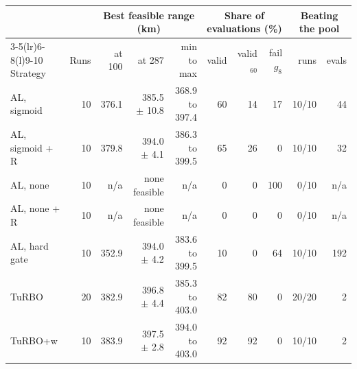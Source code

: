 \begin{tabular*}{\linewidth}{@{\extracolsep{\fill}}lrrrrrrrrr@{}}
\toprule
 & & \multicolumn{3}{c}{Best feasible range (km)} & \multicolumn{3}{c}{Share of evaluations (\%)} & \multicolumn{2}{c}{Beating the pool} \\
\cmidrule(lr){3-5}\cmidrule(lr){6-8}\cmidrule(l){9-10}
Strategy & Runs & at 100 & at 287 & min to max & valid & valid$_{60}$ & fail $g_8$ & runs & evals \\
\midrule
AL, sigmoid & 10 & 376.1 & 385.5 $\pm$ 10.8 & 368.9 to 397.4 & 60 & 14 & 17 & 10/10 & 44 \\
AL, sigmoid + R & 10 & 379.8 & 394.0 $\pm$ 4.1 & 386.3 to 399.5 & 65 & 26 & 0 & 10/10 & 32 \\
AL, none & 10 & n/a & none feasible & n/a & 0 & 0 & 100 & 0/10 & n/a \\
AL, none + R & 10 & n/a & none feasible & n/a & 0 & 0 & 0 & 0/10 & n/a \\
AL, hard gate & 10 & 352.9 & 394.0 $\pm$ 4.2 & 383.6 to 399.5 & 10 & 0 & 64 & 10/10 & 192 \\
TuRBO & 20 & 382.9 & 396.8 $\pm$ 4.4 & 385.3 to 403.0 & 82 & 80 & 0 & 20/20 & 2 \\
TuRBO+w & 10 & 383.9 & 397.5 $\pm$ 2.8 & 394.0 to 403.0 & 92 & 92 & 0 & 10/10 & 2 \\
\bottomrule
\end{tabular*}

